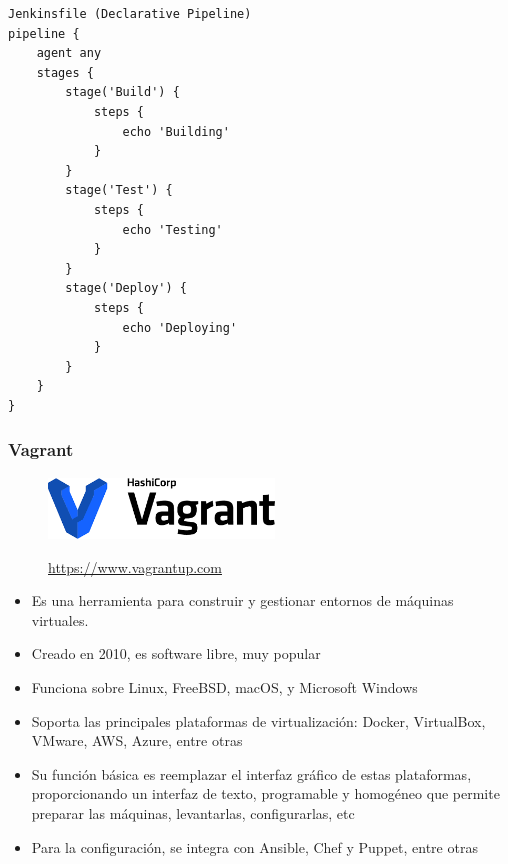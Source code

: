 \documentclass[ucs]{beamer}
\begin{document}
\begin{frame}[fragile]

  \begin{scriptsize}
  \begin{verbatim}
Jenkinsfile (Declarative Pipeline)
pipeline {
    agent any
    stages {
        stage('Build') {
            steps {
                echo 'Building'
            }
        }
        stage('Test') {
            steps {
                echo 'Testing'
            }
        }
        stage('Deploy') {
            steps {
                echo 'Deploying'
            }
        }
    }
}
  \end{verbatim}
  \end{scriptsize}
\end{frame}


\begin{frame}[fragile]
\frametitle{Vagrant}


\begin{figure}
\centerline{\includegraphics[width=6cm]{figs/logo_vagrant}}
\url{https://www.vagrantup.com}
\end{figure}


\begin{itemize}
\item
Es una herramienta para construir y gestionar entornos de
máquinas virtuales.

\item
Creado en 2010, es software libre, muy popular

\item
Funciona sobre
Linux, FreeBSD, macOS, y Microsoft Windows
\end{itemize}
\end{frame}

\begin{frame}[fragile]
\begin{itemize}
\item
Soporta las principales plataformas de virtualización:
Docker, VirtualBox, VMware, AWS, Azure,  entre otras

\item
Su función básica es reemplazar el interfaz gráfico de estas
plataformas, proporcionando un interfaz de texto,
programable y homogéneo que permite preparar las máquinas, levantarlas,
configurarlas, etc

\item
Para la configuración, se integra con Ansible, Chef y Puppet, entre otras
\end{itemize}
\end{frame}
\end{document}
